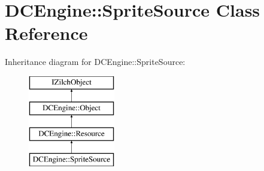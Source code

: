 \hypertarget{classDCEngine_1_1SpriteSource}{\section{D\-C\-Engine\-:\-:Sprite\-Source Class Reference}
\label{classDCEngine_1_1SpriteSource}
}
Inheritance diagram for D\-C\-Engine\-:\-:Sprite\-Source\-:\begin{figure}[H]
\begin{center}
\leavevmode
\includegraphics[height=4.000000cm]{classDCEngine_1_1SpriteSource}
\end{center}
\end{figure}
